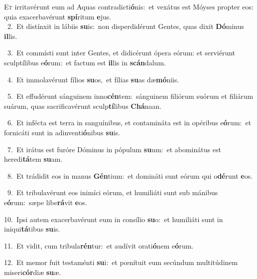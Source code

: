 \lettrine{\initial\textcolor{\initialcolor}{E}}{t} irritavérunt eum ad Aquas contradicti\-\textbf{ó}\-nis:~\star et vexátus est Móyses propter eos: quia exacerbavérunt \textbf{spí}\-ritum \textbf{e}\-jus.\\
{\numbfont\textcolor{\numbcolor}{~2.}}~Et distínxit in lábiis \textbf{su}\-is:~\star non disperdidérunt Gentes, quas dixit \textbf{Dó}\-minus \textbf{il}\-lis.\par
{\numbfont\textcolor{\numbcolor}{~3.}}~Et commísti sunt inter Gentes, et didicérunt ópera eórum: et serviérunt sculptílibus e\-\textbf{ó}\-rum:~\star et factum est \textbf{il}\-lis in \textbf{scán}\-dalum.\par
{\numbfont\textcolor{\numbcolor}{~4.}}~Et immolavérunt fílios \textbf{su}\-os,~\star et fílias \textbf{su}\-as dæ\-\textbf{mó}\-niis.\par
{\numbfont\textcolor{\numbcolor}{~5.}}~Et effudérunt sánguinem inno\-\textbf{cén}\-tem:~\star sánguinem filiórum suórum et filiárum suárum, quas sacrificavérunt sculp\-\textbf{tí}\-libus \textbf{Chá}\-naan.\par
{\numbfont\textcolor{\numbcolor}{~6.}}~Et infécta est terra in sanguínibus, et contamináta est in opéribus e\-\textbf{ó}\-rum:~\star et fornicáti sunt in adinventi\-\textbf{ó}\-nibus \textbf{su}\-is.\par
{\numbfont\textcolor{\numbcolor}{~7.}}~Et irátus est furóre Dóminus in pópulum \textbf{su}\-um:~\star et abominátus est heredi\-\textbf{tá}\-tem \textbf{su}\-am.\par
{\numbfont\textcolor{\numbcolor}{~8.}}~Et trádidit eos in manus \textbf{Gén}\-tium:~\star et domináti sunt eórum qui o\-\textbf{dé}\-runt \textbf{e}\-os.\par
{\numbfont\textcolor{\numbcolor}{~9.}}~Et tribulavérunt eos inimíci eórum, et humiliáti sunt sub mánibus e\-\textbf{ó}\-rum:~\star sæpe libe\-\textbf{rá}\-vit \textbf{e}\-os.\par
{\numbfont\textcolor{\numbcolor}{10.}}~Ipsi autem exacerbavérunt eum in consílio \textbf{su}\-o:~\star et humiliáti sunt in iniqui\-\textbf{tá}\-tibus \textbf{su}\-is.\par
{\numbfont\textcolor{\numbcolor}{11.}}~Et vidit, cum tribula\-\textbf{rén}\-tur:~\star et audívit orati\-\textbf{ó}\-nem e\-\textbf{ó}\-rum.\par
{\numbfont\textcolor{\numbcolor}{12.}}~Et memor fuit testaménti \textbf{su}\-i:~\star et pœnítuit eum secúndum multitúdinem miseri\-\textbf{cór}\-diæ \textbf{su}\-æ.\par
